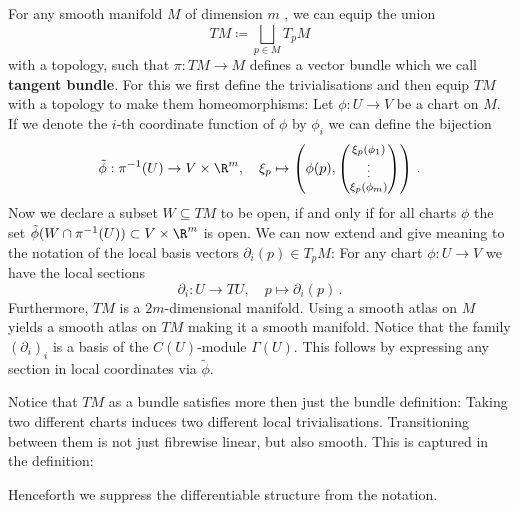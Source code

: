 \begin{example}
	For any smooth manifold $M$ of dimension $m$ , we can equip the union 
	\begin{equation*}
		TM\coloneq \bigsqcup_{p\in M} T_pM
	\end{equation*} with a topology, such that $\pi: TM\to M$ defines a vector bundle which we call \textbf{tangent bundle}. For this we first define the trivialisations and then equip $TM$ with a topology to make them homeomorphisms: Let $\phi:U\to V$ be a chart on $M$. If we denote the $i$-th coordinate function of $\phi$ by $\phi_i$ we can define the bijection \begin{equation*}
	\tilde{\phi}:\pi^{-1}(U)\to V\times \R^m,\quad \xi_p\mapsto \left(\phi(p),{\footnotesize
	\begin{pmatrix}
		\xi_p(\phi_1)\\
		\vdots\\
		\xi_p(\phi_m)
	\end{pmatrix}
	}\right)\,.
	\end{equation*} Now we declare a subset $W\subseteq TM$ to be open, if and only if for all charts $\phi$ the set $\tilde{\phi}(W\cap \pi^{-1}(U)) \subset V\times \R^m$ is open.
	We can now extend and give meaning to the notation of the local basis vectors $\partial_i(p)\in T_pM$: For any chart $\phi:U\to V$ we have the local sections 
	\begin{equation*}
		\partial_i: U\to TU,\quad p\mapsto \partial_i(p)\,.
	\end{equation*}
	Furthermore, $TM$ is a $2m$-dimensional manifold. Using a smooth atlas on $M$ yields a smooth atlas on $TM$ making it a smooth manifold.
	Notice that the family $\left(\partial_i\right)_i$ is a basis of the $C(U)$-module $\Gamma(U)$. This follows by expressing any section in local coordinates via $\tilde{\phi}$.
\end{example}
Notice that $TM$ as a bundle satisfies more then just the bundle definition: Taking two different charts induces two different local trivialisations. Transitioning between them is not just fibrewise linear, but also smooth. This is captured in the definition:

Henceforth we suppress the differentiable structure from the notation.



